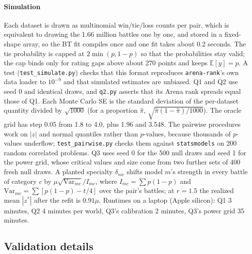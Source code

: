 \documentclass[12pt]{article}
\begin{document}
\paragraph{Simulation} Each dataset is drawn as multinomial win/tie/loss counts per pair, which is equivalent to drawing the 1.66 million battles one by one, and stored in a fixed-shape array, so the BT fit compiles once and one fit takes about 0.2 seconds. The tie probability is capped at $2\min(p, 1-p)$ so that the probabilities stay valid; the cap binds only for rating gaps above about 270 points and keeps $\mathbb E[y] = p$. A test (\texttt{test\_simulate.py}) checks that this format reproduces \texttt{arena-rank}'s own data loader to $10^{-9}$ and that simulated estimates are unbiased. Q1 and Q2 use seed 0 and identical draws, and \texttt{q2.py} asserts that its Arena rank spreads equal those of Q1. Each Monte Carlo SE is the standard deviation of the per-dataset quantity divided by $\sqrt{1000}$ (for a proportion $\hat\pi$, $\sqrt{\hat\pi(1-\hat\pi)/1000}$). The oracle grid has step 0.05 from 1.8 to 4.0, plus 1.96 and 3.548. The pairwise procedures work on $|z|$ and normal quantiles rather than $p$-values, because thousands of $p$-values underflow; \texttt{test\_pairwise.py} checks them against \texttt{statsmodels} on 200 random correlated problems. Q3 uses seed 0 for the 500 null draws and seed 1 for the power grid, whose critical values and size come from two further sets of 400 fresh null draws. A planted specialty $\delta_{mc}$ shifts model $m$'s strength in every battle of category $c$ by $\mu\sqrt{\mathrm{Var}_{mc}}/I_{mc}$, where $I_{mc} = \sum p(1-p)$ and $\mathrm{Var}_{mc} = \sum[p(1-p) - t/4]$ over the pair's battles; at $r = 1.5$ the realized mean $|z^*|$ after the refit is $0.91\mu$. Runtimes on a laptop (Apple silicon): Q1 3 minutes, Q2 4 minutes per world, Q3's calibration 2 minutes, Q3's power grid 35 minutes.

\FloatBarrier
\subsection{Validation details}\label{app:step0}
\end{document}
